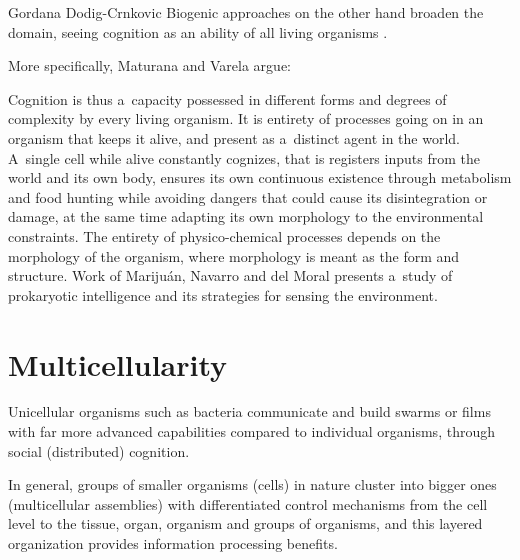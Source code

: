 \begin{artengenv}{Gordana Dodig-Crnkovic}
Biogenic approaches on the other hand broaden the domain, seeing cognition as an ability of all living organisms
\parencites{maturana_biology_1970}{maturana_autopoiesis_1980}{stewart_cognition_1996}.

More specifically, Maturana and Varela argue:

Cognition is thus a~capacity possessed in different forms and degrees of complexity by every living organism. It is entirety of processes going on in an organism that keeps it alive, and present as a~distinct agent in the world. A~single cell while alive constantly cognizes, that is registers inputs from the world and its own body, ensures its own continuous existence through metabolism and food hunting while avoiding dangers that could cause its disintegration or damage, at the same time adapting its own morphology to the environmental constraints. The entirety of physico-chemical processes depends on the morphology of the organism, where morphology is meant as the form and structure. Work of Marijuán, Navarro and del Moral
\parencite*{marijuan_prokaryotic_2010}
presents a~study of prokaryotic intelligence and its strategies for sensing the environment.

\section*{Multicellularity}
Unicellular organisms such as bacteria communicate and build swarms or films with far more advanced capabilities compared to individual organisms, through social (distributed) cognition.

In general, groups of smaller organisms (cells) in nature cluster into bigger ones (multicellular assemblies) with differentiated control mechanisms from the cell level to the tissue, organ, organism and groups of organisms, and this layered organization provides information processing benefits.


\end{artengenv}
